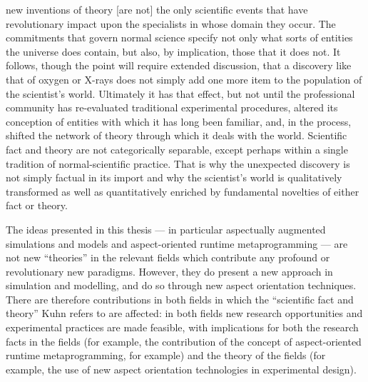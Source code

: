 \begin{displayquote}
   [\ldots{}] new inventions of theory [are not] the only scientific events that have
   revolutionary impact upon the specialists in whose domain they occur. The
   commitments that govern normal science specify not only what sorts of
   entities the universe does contain, but also, by implication, those that it
   does not. It follows, though the point will require extended discussion, that
   a discovery like that of oxygen or X-rays does not simply add one more item
   to the population of the scientist's world. Ultimately it has that effect,
   but not until the professional community has re-evaluated traditional
   experimental procedures, altered its conception of entities with which it has
   long been familiar, and, in the process, shifted the network of theory
   through which it deals with the world. Scientific fact and theory are not
   categorically separable, except perhaps within a single tradition of
   normal-scientific practice. That is why the unexpected discovery is not
   simply factual in its import and why the scientist's world is qualitatively
   transformed as well as quantitatively enriched by fundamental novelties of
   either fact or theory. 
\end{displayquote}

The ideas presented in this thesis --- in particular aspectually augmented
simulations and models and aspect-oriented runtime metaprogramming --- are not
new ``theories'' in the relevant fields which contribute any profound or
revolutionary new paradigms. However, they do present a new approach in
simulation and modelling, and do so through new aspect orientation techniques.
There are therefore contributions in both fields in which the ``scientific fact
and theory'' Kuhn refers to are affected: in both fields new research
opportunities and experimental practices are made feasible, with implications
for both the research facts in the fields (for example, the contribution of the
concept of aspect-oriented runtime metaprogramming, for example) and the theory
of the fields (for example, the use of new aspect orientation technologies in
experimental design).

